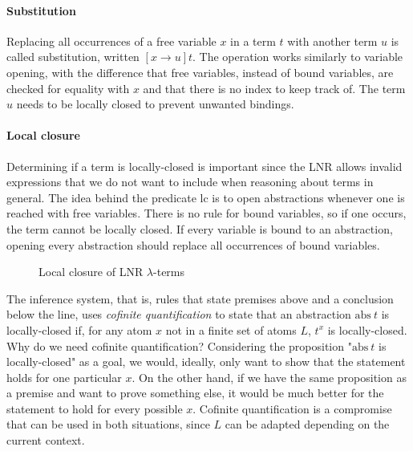\documentclass[a4paper, 11pt, fleqn]{scrreprt}
\begin{document}
	\paragraph{Substitution}
	Replacing all occurrences of a free variable $x$ in a term $t$ with another term $u$ is called substitution, written $[x \rightarrow u]t$. The operation works similarly to variable opening, with the difference that free variables, instead of bound variables, are checked for equality with $x$ and that there is no index to keep track of. The term $u$ needs to be locally closed to prevent unwanted bindings.
	\paragraph{Local closure}
	Determining if a term is locally-closed is important since the LNR allows invalid expressions that we do not want to include when reasoning about terms in general. The idea behind the predicate $\text{lc}$ is to open abstractions whenever one is reached with free variables. There is no rule for bound variables, so if one occurs, the term cannot be locally closed. If every variable is bound to an abstraction, opening every abstraction should replace all occurrences of bound variables.
	\begin{figure}[H]
		\begin{center}
			\begin{minipage}[t]{.3 \linewidth}
			\end{minipage}
			\begin{minipage}[t]{.3 \linewidth}
			\end{minipage}
			\begin{minipage}[t]{.3 \linewidth}
			\end{minipage}
		\end{center}
	\caption{Local closure of LNR $\lambda$-terms}
	\label{lc}
	\end{figure} \noindent
	The inference system, that is, rules that state premises above and a conclusion below the line, uses \textit{cofinite quantification} to state that an abstraction $\text{abs} \ t$ is locally-closed if, for any atom $x$ not in a finite set of atoms $L$, $t^x$ is locally-closed. Why do we need cofinite quantification? Considering the proposition "$\text{abs} \ t$ is locally-closed" as a goal, we would, ideally, only want to show that the statement holds for one particular $x$. On the other hand, if we have the same proposition as a premise and want to prove something else, it would be much better for the statement to hold for every possible $x$. Cofinite quantification is a compromise that can be used in both situations, since $L$ can be adapted depending on the current context.
\end{document}
